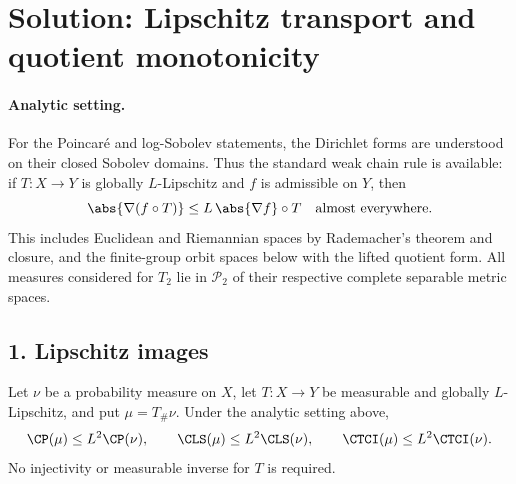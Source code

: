 \documentclass[../main.tex]{subfiles}
\begin{document}

\section*{Solution: Lipschitz transport and quotient monotonicity}
\label{sec:sol-a5-lipschitz-quotient}

\paragraph{Analytic setting.}
For the Poincar\'e and log-Sobolev statements, the Dirichlet forms are understood on their closed
Sobolev domains.  Thus the standard weak chain rule is available: if \(T:X\to Y\) is globally
\(L\)-Lipschitz and \(f\) is admissible on \(Y\), then
\begin{equation}\label{eq:sol-a5-chain}
 \abs{\nabla(f\circ T)}\le L\,\abs{\nabla f}\circ T
 \quad\text{almost everywhere}.
\end{equation}
This includes Euclidean and Riemannian spaces by Rademacher's theorem and closure, and the
finite-group orbit spaces below with the lifted quotient form.  All measures considered for
\(T_2\) lie in \(\mathcal P_2\) of their respective complete separable metric spaces.

\subsection*{1. Lipschitz images}

\begin{lemma}
\label{lem:sol-a5-lipschitz}
Let \(\nu\) be a probability measure on \(X\), let \(T:X\to Y\) be measurable and globally
\(L\)-Lipschitz, and put \(\mu=T_\#\nu\).  Under the analytic setting above,
\[
 \CP(\mu)\le L^2\CP(\nu),\qquad
 \CLS(\mu)\le L^2\CLS(\nu),\qquad
 \CTCI(\mu)\le L^2\CTCI(\nu).
\]
No injectivity or measurable inverse for \(T\) is required.
\end{lemma}
\end{document}

